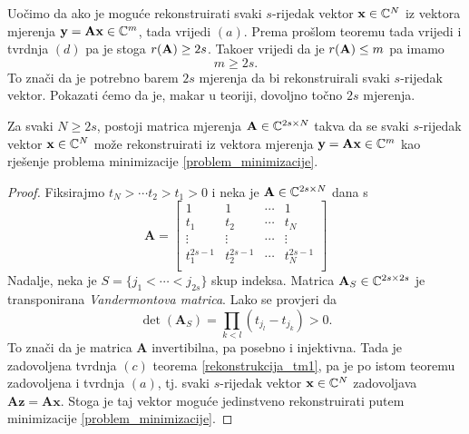 \documentclass[a4paper,twoside,12pt]{memoir} %
\newcommand{\vect}[1]{\mathbf{#1}}
\renewcommand{\vec}{\vect}
\newcommand{\rank}{\text\normalfont{r}}
\begin{document}
Uo\v{c}imo da ako je mogu\'ce rekonstruirati svaki $s$-rijedak vektor $\vec x \in \C^N$ iz vektora mjerenja $\vec y = \vec{Ax} \in \C^m$, tada vrijedi $(a)$. Prema pro\v{s}lom teoremu tada vrijedi i tvrdnja $(d)$ pa je stoga $\rank(\vec A) \geq 2s$. Tako\dj er vrijedi da je $\rank(\vec A) \leq m$ pa imamo 
\begin{equation*}
    m \geq 2s.    
\end{equation*}
To zna\v{c}i da je potrebno barem $2s$ mjerenja da bi rekonstruirali svaki $s$-rijedak vektor. Pokazati \'cemo da je, makar u teoriji, dovoljno to\v{c}no $2s$ mjerenja.

\begin{thm}
    Za svaki $N \geq 2s$, postoji matrica mjerenja $\vec A \in \C^{2s \times N}$ takva da se svaki $s$-rijedak vektor $\vec x \in \C^N$ mo\v{z}e rekonstruirati iz vektora mjerenja $\vec y = \vec{Ax} \in \C^m$ kao rje\v{s}enje problema minimizacije \eqref{problem_minimizacije}.
\end{thm}
\begin{proof}
    Fiksirajmo $t_N>\cdots t_2 > t_1 > 0$ i neka je $\vec A \in \C^{2s \times N}$ dana s
    \begin{equation}\label{vandermont_matrica}
        \vec A = 
        \begin{bmatrix}
            1 & 1 & \cdots & 1 \\ 
            t_1 & t_2 & \cdots & t_N \\
            \vdots & \vdots & \cdots & \vdots \\
            t_1^{2s-1} & t_2^{2s-1} & \cdots & t_N^{2s-1} \\
        \end{bmatrix}
    \end{equation}
    Nadalje, neka je $S=\{j_1 < \cdots < j_{2s}\}$ skup indeksa. Matrica $\vec A_S \in \C^{2s \times 2s}$ je transponirana \textit{Vandermontova matrica}. Lako se provjeri da
    \begin{equation*}
        \det(\vec{A}_S) = \prod_{k < l} (t_{j_l} - t_{j_k})>0.
    \end{equation*}
    To zna\v{c}i da je matrica $\vec A$ invertibilna, pa posebno i injektivna. Tada je zadovoljena tvrdnja $(c)$ teorema \ref{rekonstrukcija_tm1}, pa je po istom teoremu zadovoljena i tvrdnja $(a)$, tj. svaki $s$-rijedak vektor $\vec x \in \C^N$ zadovoljava $\vec{Az}=\vec{Ax}$. Stoga je taj vektor mogu\'ce jedinstveno rekonstruirati putem minimizacije \eqref{problem_minimizacije}.
\end{proof}
\end{document}
